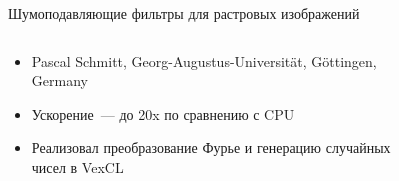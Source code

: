 \documentclass[@BEAMER_OPTIONS@]{beamer}
\begin{document}
\begin{frame}{Шумоподавляющие фильтры для растровых изображений}
    \begin{columns}
        \begin{column}{0.4\textwidth}
            \begin{itemize}
                \item Pascal Schmitt, Georg-Augustus-Universit\"at,
                    G\"ottingen, Germany
                \item Ускорение~--- до 20x по сравнению с CPU
                \item Реализовал преобразование Фурье и генерацию случайных
                    чисел в VexCL
            \end{itemize}
        \end{column}
        \begin{column}{0.55\textwidth}
            \vspace{-1\baselineskip}
            \begin{figure}
            \end{figure}
        \end{column}
    \end{columns}
\end{frame}
\end{document}
